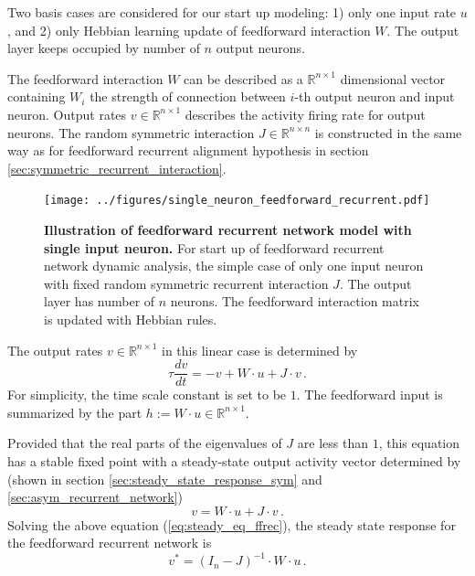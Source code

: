 \documentclass[11pt]{article}
\begin{document}
{	Two basis cases are considered for our start up modeling: 1) only one input rate $u$, and 2) only Hebbian learning update of feedforward interaction $W$. The output layer keeps occupied by number of $n$ output neurons. 
	
	The feedforward interaction $W$ can be described as a $\mathbb{R}^{n \times 1}$ dimensional vector containing $W_i$ the strength of connection between $i$-th output neuron and input neuron. Output rates $v \in \mathbb{R}^{n \times 1}$ describes the activity firing rate for output neurons. The random symmetric interaction $J \in \mathbb{R}^{n \times n}$ is constructed in the same way as for feedforward recurrent alignment hypothesis in section \ref{sec:symmetric_recurrent_interaction}. 
	
		\begin{figure}[H]
			\centering
			\texttt{[image: ../figures/single\_neuron\_feedforward\_recurrent.pdf]}
			\caption{\textbf{Illustration of feedforward recurrent network model with single input neuron.} For start up of feedforward recurrent network dynamic analysis, the simple case of only one input neuron with fixed random symmetric recurrent interaction $J$. The output layer has number of $n$ neurons. The feedforward interaction matrix is updated with Hebbian rules.}
			\label{fig:single_neuron_feedforward_recurrent_network}
		\end{figure}
	
	The output rates $v \in \mathbb{R}^{n \times 1}$ in this linear case is determined by 
		\begin{equation} \label{eq:response_ffrec_network}
			\tau \frac{dv}{dt} = -v + W \cdot u + J \cdot v \,.
		\end{equation}
	For simplicity, the time scale constant is set to be $1$. The feedforward input is summarized by the part $h := W \cdot u \in \mathbb{R}^{n \times 1}$.  
	
	Provided that the real parts of the eigenvalues of $J$ are less than $1$, this equation has a stable fixed point with a steady-state output activity vector determined by (shown in section \ref{sec:steady_state_response_sym} and \ref{sec:asym_recurrent_network})
		\begin{equation} \label{eq:steady_eq_ffrec}
			v = W \cdot u + J \cdot v \, .
		\end{equation}
	Solving the above equation (\ref{eq:steady_eq_ffrec}), the steady state response for the feedforward recurrent network is
		\begin{equation} \label{eq:steady_state_ffrec}
			v^* = (I_n - J)^{-1} \cdot W \cdot u \, .
		\end{equation}
	
}
\end{document}
